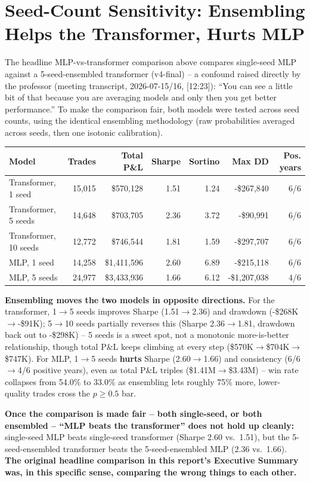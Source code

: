 \documentclass[11pt]{article}
\begin{document}
\section{Seed-Count Sensitivity: Ensembling Helps the Transformer, Hurts MLP}
The headline MLP-vs-transformer comparison above compares single-seed MLP against a 5-seed-ensembled
transformer (v4-final) -- a confound raised directly by the professor (meeting transcript, 2026-07-15/16,
[12:23]): ``You can see a little bit of that because you are averaging models and only then you get better
performance.'' To make the comparison fair, both models were tested across seed counts, using the identical
ensembling methodology (raw probabilities averaged across seeds, then one isotonic calibration).
\begin{table}[H]
\centering
\small
\begin{tabular}{lrrrrrr}
\toprule
Model & Trades & Total P\&L & Sharpe & Sortino & Max DD & Pos. years \\
\midrule
Transformer, 1 seed & 15,015 & \$570,128 & 1.51 & 1.24 & -\$267,840 & 6/6 \\
Transformer, 5 seeds & 14,648 & \$703,705 & 2.36 & 3.72 & -\$90,991 & 6/6 \\
Transformer, 10 seeds & 12,772 & \$746,544 & 1.81 & 1.59 & -\$297,707 & 6/6 \\
MLP, 1 seed & 14,258 & \$1,411,596 & 2.60 & 6.89 & -\$215,118 & 6/6 \\
MLP, 5 seeds & 24,977 & \$3,433,936 & 1.66 & 6.12 & -\$1,207,038 & 4/6 \\
\bottomrule
\end{tabular}
\end{table}
\textbf{Ensembling moves the two models in opposite directions.} For the transformer, 1$\to$5 seeds
improves Sharpe (1.51$\to$2.36) and drawdown (-\$268K$\to$-\$91K); 5$\to$10 seeds partially reverses this
(Sharpe 2.36$\to$1.81, drawdown back out to -\$298K) -- 5 seeds is a sweet spot, not a monotonic
more-is-better relationship, though total P\&L keeps climbing at every step (\$570K$\to$\$704K$\to$\$747K).
For MLP, 1$\to$5 seeds \textbf{hurts} Sharpe (2.60$\to$1.66) and consistency (6/6$\to$4/6 positive years),
even as total P\&L triples (\$1.41M$\to$\$3.43M) -- win rate collapses from 54.0\% to 33.0\% as ensembling
lets roughly 75\% more, lower-quality trades cross the $p\ge0.5$ bar.

\textbf{Once the comparison is made fair -- both single-seed, or both ensembled -- ``MLP beats the
transformer'' does not hold up cleanly:} single-seed MLP beats single-seed transformer (Sharpe 2.60 vs.\
1.51), but the 5-seed-ensembled transformer beats the 5-seed-ensembled MLP (2.36 vs.\ 1.66). \textbf{The
original headline comparison in this report's Executive Summary was, in this specific sense, comparing the
wrong things to each other.}
\end{document}
